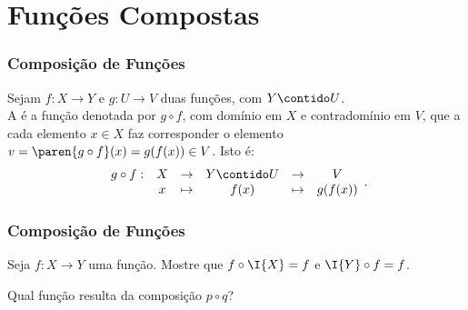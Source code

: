 \section{Funções Compostas}
\begin{frame}
\frametitle{Composição de Funções} 

\begin{definicao}
Sejam $f: X \to Y$ e $g: U \to V$ duas funções, com $Y \contido U$.\\
A  é a função denotada por $g
\circ f$, com domínio em $X$ e contradomínio em $V$, que a cada
elemento $x \in X$ faz corresponder o elemento $v = \paren{g \circ
f}(x) = g(f(x)) \in V$. Isto é:
$$\begin{array}{cccccc}
g \circ f : & X & \to     & Y \contido U & \to & V \\
		 &  x & \mapsto & f(x) & \mapsto & g(f(x))
\end{array}.$$
\end{definicao}

\end{frame}


\begin{frame}
\frametitle{Composição de Funções} 

\begin{exemplo}
Seja $f: X \to Y$ uma função. Mostre que $f \circ \I{X} = f$ e $\I{Y}
\circ f = f$.
\end{exemplo}\pause

\begin{exemplo}
Qual função resulta da composição $p \circ q$?
\end{exemplo}
\end{frame}

